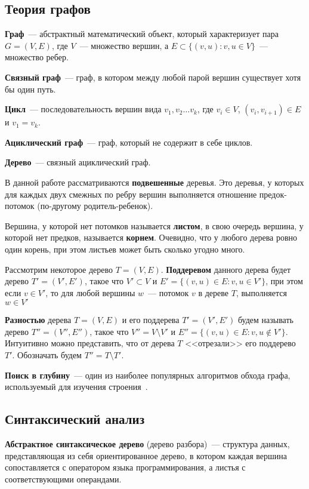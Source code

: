 \subsection{Теория графов}

\textbf{Граф}~--- абстрактный математический объект, который характеризует 
пара $G = (V, E)$, где $V$~--- множество вершин, а $E \subset \{(v, u): v, u \in V\}$~--- множество ребер. 

\textbf{Связный граф}~--- граф, в котором между любой парой вершин существует хотя бы один путь.

\textbf{Цикл}~--- последовательность вершин вида $v_1, v_2 \dots v_k$, где $v_i \in V$, 
$(v_i, v_{i+1}) \in E$ и $v_1 = v_k$.

\textbf{Ациклический граф}~--- граф, который не содержит в себе циклов.

\textbf{Дерево}~--- связный ациклический граф.

В данной работе рассматриваются \textbf{подвешенные} деревья. Это деревья, у которых для каждых двух смежных по ребру
вершин выполняется отношение предок-потомок (по-другому родитель-ребенок).

Вершина, у которой нет потомков называется \textbf{листом}, в свою очередь вершина, у которой нет предков,
называется \textbf{корнем}. Очевидно, что у любого дерева ровно один корень, при этом листьев может быть сколько угодно много.

Рассмотрим некоторое дерево $T = (V, E)$. \textbf{Поддеревом} данного дерева будет дерево $T' = (V', E')$, такое что
$V' \subset V$ и $E' = \{(v, u) \in E : v, u \in V'\}$, при этом если $v \in V'$, то для любой
вершины $w$~--- потомок $v$ в дереве $T$, выполняется $w \in V'$

\textbf{Разностью} дерева $T = (V, E)$ и его поддерева $T' = (V', E')$ будем называть дерево $T'' = (V'', E'')$,
такое что $V'' = V \setminus V'$ и $E'' = \{(v, u) \in E : v, u \notin V'\}$. Интуитивно можно представить, что от дерева
$T$ <<отрезали>> его поддерево $T'$. Обозначать будем $T'' = T \setminus T'$.


\textbf{Поиск в глубину}~--- один из наиболее популярных алгоритмов обхода графа, используемый для изучения строения~\cite{cormen}. 

\subsection{Синтаксический анализ}

\textbf{Абстрактное синтаксическое дерево} (дерево разбора)~--- структура данных, представляющая из себя ориентированное дерево, 
в котором каждая вершина сопоставляется с оператором языка программирования, а листья с соответствующими операндами. 

